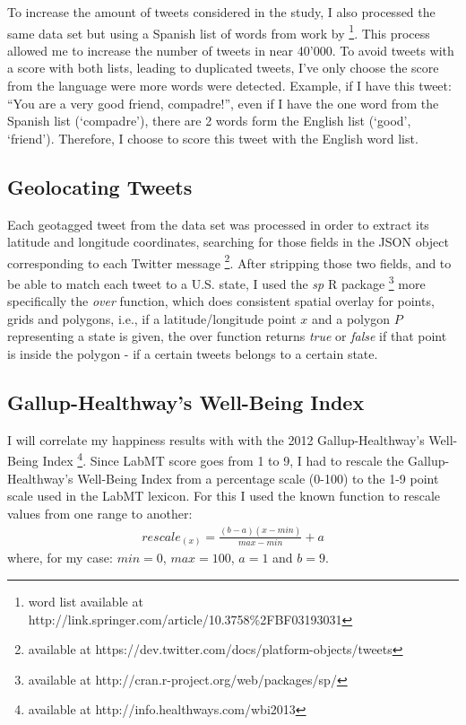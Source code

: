 \documentclass{llncs}
\begin{document}
To increase the amount of tweets considered in the study, I also processed the same data set but using a Spanish list of words from work by \cite{Redondo2007} \footnote{word list available at http://link.springer.com/article/10.3758\%2FBF03193031}. This process allowed me to increase the number of tweets in near 40'000. To avoid tweets with a score with both lists, leading to duplicated tweets, I've only choose the score from the language were more words were detected. Example, if I have this tweet: ``You are a very good friend, compadre!'', even if I have the one word from the Spanish list (`compadre'), there are 2 words form the English list (`good', `friend'). Therefore, I choose to score this tweet with the English word list.


\subsection{Geolocating Tweets}
\label{sec:meth2}
Each geotagged tweet from the data set was processed in order to extract its latitude and longitude coordinates, searching for those
fields in the JSON object corresponding to each Twitter message \footnote{available at https://dev.twitter.com/docs/platform-objects/tweets}. After stripping those two fields, and to be able to match each tweet to a U.S. state, I used the \emph{sp} R package \footnote{available at http://cran.r-project.org/web/packages/sp/} more specifically the \emph{over} function, which does consistent spatial overlay for points, grids and polygons, i.e., if a latitude/longitude point $x$ and a polygon $P$ representing a state is given, the over function returns \emph{true} or \emph{false} if that point is inside the polygon - if a certain tweets belongs to a certain state.


\subsection{Gallup-Healthway's Well-Being Index}
\label{sec:meth3}
I will correlate my happiness results with with the 2012 Gallup-Healthway's Well-Being Index \cite{GallupHealthway2013} \footnote{available at http://info.healthways.com/wbi2013}. Since LabMT score goes from 1 to 9, I had to rescale the Gallup-Healthway's Well-Being Index from a percentage scale (0-100) to the 1-9 point scale used in the LabMT lexicon. For this I used the known function to rescale values from one range to another:
\begin{align*}
rescale_(x) = \frac{(b-a)(x-min)}{max-min} + a \tag{2}\label{eq:2}
\end{align*}
where, for my case: $min = 0$, $max = 100$, $a = 1$ and $b = 9$.
\end{document}
